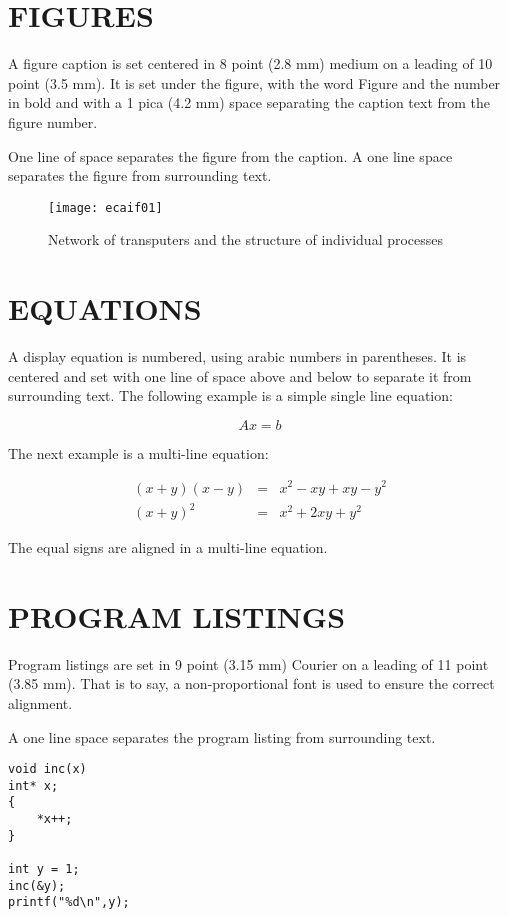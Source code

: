 \documentclass{ecai2014}
\begin{document}
\section{FIGURES}
A figure caption is set centered in 8 point (2.8 mm) medium on a
leading of 10 point (3.5 mm).  It is set under the figure, with the
word Figure and the number in bold and with a 1 pica (4.2 mm) space
separating the caption text from the figure number.

One line of space separates the figure from the caption. A one line
space separates the figure from surrounding text.

\begin{figure}
\centerline{\texttt{[image: ecaif01]}}
\caption{Network of transputers and the structure of individual
processes } \label{procstructfig}
\end{figure}

\section{EQUATIONS}
A display equation is numbered, using arabic numbers in parentheses.
It is centered and set with one line of space above and below to
separate it from surrounding text. The following example is a simple
single line equation:

\begin{equation}
Ax=b
\label{thesystem}
\end{equation}

The next example is a multi-line equation:

\begin{eqnarray}
(x+y)(x-y) & = & x^2-xy+xy-y^2\\
(x+y)^2    & = & x^2+2xy+y^2
\end{eqnarray}

The equal signs are aligned in a multi-line equation.

\section{PROGRAM LISTINGS}
Program listings are set in 9 point (3.15 mm) Courier on a
leading of 11 point (3.85 mm). That is to say, a non-proportional
font is used to ensure the correct alignment.

A one line space separates the program listing from surrounding text.

\begin{verbatim}
void inc(x)
int* x;
{
    *x++;
}

int y = 1;
inc(&y);
printf("%d\n",y);
\end{verbatim}
\end{document}
